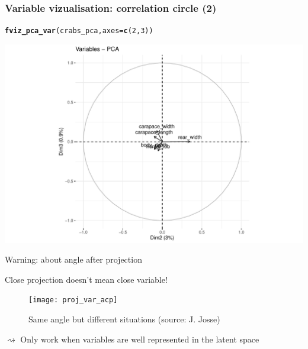 \documentclass{beamer}\usepackage[]{graphicx}\usepackage[]{color}
\makeatletter
\newcommand{\hlnum}[1]{\textcolor[rgb]{0.686,0.059,0.569}{#1}}%
\newcommand{\hlstd}[1]{\textcolor[rgb]{0.345,0.345,0.345}{#1}}%
\newcommand{\hlkwc}[1]{\textcolor[rgb]{0.333,0.667,0.333}{#1}}%
\newcommand{\hlkwd}[1]{\textcolor[rgb]{0.737,0.353,0.396}{\textbf{#1}}}%
\newenvironment{kframe}{%
 \def\at@end@of@kframe{}%
 \ifinner\ifhmode%
  \def\at@end@of@kframe{\end{minipage}}%
  \begin{minipage}{\columnwidth}%
 \fi\fi%
 \def\FrameCommand##1{\hskip\@totalleftmargin \hskip-\fboxsep
 \colorbox{shadecolor}{##1}\hskip-\fboxsep
     \hskip-\linewidth \hskip-\@totalleftmargin \hskip\columnwidth}%
 \MakeFramed {\advance\hsize-\width
   \@totalleftmargin\z@ \linewidth\hsize
   \@setminipage}}%
 {\par\unskip\endMakeFramed%
 \at@end@of@kframe}
\newenvironment{knitrout}{}{} %
\makeatother
\begin{document}
\begin{frame}[fragile]
  \frametitle{Variable vizualisation: correlation circle (2)}

\begin{knitrout}\scriptsize
{}\color{fgcolor}\begin{kframe}
\begin{alltt}
\hlkwd{fviz_pca_var}\hlstd{(crabs_pca,} \hlkwc{axes} \hlstd{=} \hlkwd{c}\hlstd{(}\hlnum{2}\hlstd{,}\hlnum{3}\hlstd{))}
\end{alltt}
\end{kframe}
\includegraphics[width=.8\textwidth]{figures/pca_crabs_varmap2-1} 

\end{knitrout}

\end{frame}

\begin{frame}{Warning: about angle after projection}

  \alert{Close projection doesn't mean close variable!}

  \begin{figure}
    \texttt{[image: proj\_var\_acp]}
    \caption{Same angle but different situations {\tiny (source: J. Josse)}}

  \end{figure}

 $\rightsquigarrow$ Only work when variables are well represented in the latent space
\end{frame}
\end{document}
